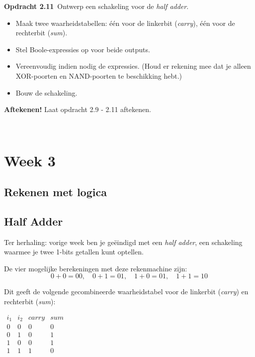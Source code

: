 \documentclass[11pt,a5paper]{report}
\begin{document}
\begin{framed}
\textbf{Opdracht 2.11}\
Ontwerp een schakeling voor de \textit{half adder}.\\
\begin{itemize}
  \item Maak twee waarheidstabellen: één voor de linkerbit (\textit{carry}), één voor de rechterbit (\textit{sum}).
  \item Stel Boole-expressies op voor beide outputs.
  \item Vereenvoudig indien nodig de expressies. (Houd er rekening mee dat je alleen XOR-poorten en NAND-poorten te beschikking hebt.)
  \item Bouw de schakeling.
\end{itemize}
\end{framed}

\begin{framed}
\textbf{Aftekenen!} Laat opdracht 2.9 - 2.11 aftekenen.
\end{framed}

\newpage\ \newpage

\chapter*{\centering Week 3}

\newpage

\section*{Rekenen met logica}

\section*{Half Adder}

Ter herhaling: vorige week ben je geëindigd met een \textit{half adder}, een schakeling waarmee je twee 1-bits getallen kunt optellen.

De vier mogelijke berekeningen met deze rekenmachine zijn:
\[
0 + 0 = 00, \quad 0 + 1 = 01, \quad 1 + 0 = 01, \quad 1 + 1 = 10
\]



\begin{minipage}[t]{0.50\textwidth}
Dit geeft de volgende gecombineerde waarheidstabel voor de linkerbit (\textit{carry}) en rechterbit (\textit{sum}):
\end{minipage}%
\hfill
\begin{minipage}[t]{0.50\textwidth}
\centering
\vspace*{-1em}
\(
\begin{array}{cc|cc}
i_1 & i_2 & carry & sum \\
\hline
0 & 0 & 0 & 0\\
0 & 1 & 0 & 1\\
1 & 0 & 0 & 1\\
1 & 1 & 1 & 0
\end{array}
\)
\end{minipage} \\
\end{document}

